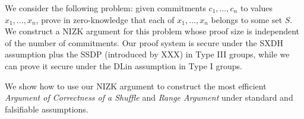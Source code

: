 We consider the following problem: given commitments $c_1,\ldots,c_n$ to values $x_1,\ldots,x_n$, prove in zero-knowledge that each of $x_1,\ldots,x_n$ belongs to some set $S$. We construct a NIZK argument for this problem whose proof size is independent of the number of commitments. Our proof system is secure under the SXDH assumption plus the SSDP (introduced by XXX) in Type III groups, while we can prove it secure under the DLin assumption in Type I groups.

We show how to use our NIZK argument to construct the most efficient \emph{Argument of Correctness of a Shuffle} and \emph{Range Argument} under standard and falsifiable assumptions. 

